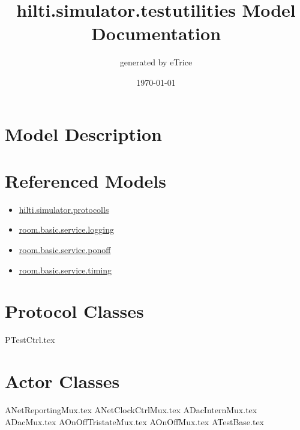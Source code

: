 \documentclass[titlepage]{article}
\title{hilti.simulator.testutilities Model Documentation}
\date{\today}
\author{generated by eTrice}
\begin{document}
\pagestyle{plain}
\maketitle
\tableofcontents

\newpage
\listoffigures
\newpage
\section{Model Description}

\section{Referenced Models}

\begin{itemize}
\item \href{hilti.simulator.protocolls.pdf}{hilti.simulator.protocolls}
\item \href{room.basic.service.logging.pdf}{room.basic.service.logging}
\item \href{room.basic.service.ponoff.pdf}{room.basic.service.ponoff}
\item \href{room.basic.service.timing.pdf}{room.basic.service.timing}
\end{itemize}
\newpage



\section{Protocol Classes}
{PTestCtrl.tex}
\newpage



\section{Actor Classes}
{ANetReportingMux.tex}
{ANetClockCtrlMux.tex}
{ADacInternMux.tex}
{ADacMux.tex}
{AOnOffTristateMux.tex}
{AOnOffMux.tex}
{ATestBase.tex}
\end{document}
